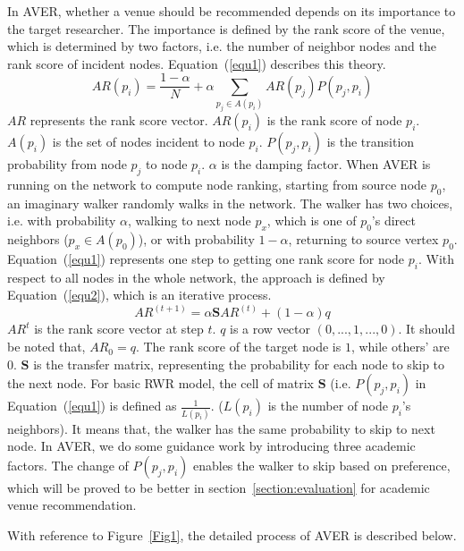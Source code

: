 \documentclass[9pt]{acm_proc_article-sp}
\begin{document}
In AVER, whether a venue should be recommended depends on its importance to the target researcher. The importance is defined by the rank score of the venue, which is determined by two factors, i.e. the number of neighbor nodes and the rank score of incident nodes. Equation~(\ref{equ1}) describes this theory.
\begin{equation}
\label{equ1}
AR(p_{i})=\frac{1-\alpha}{N}+\alpha \sum_{p_{j}\in A(p_{i})}AR(p_{j})P(p_{j},p_{i})
\end{equation}
$AR$ represents the rank score vector. $AR(p_{i})$ is the rank score of node $p_{i}$. $A(p_{i})$ is the set of nodes incident to node $p_{i}$. $P(p_{j},p_{i})$ is the transition probability from node $p_{j}$ to node $p_{i}$. $\alpha$ is the damping factor. When AVER is running on the network to compute node ranking, starting from source node $p_{0}$, an imaginary walker randomly walks in the network. The walker has two choices, i.e. with probability $\alpha$, walking to next node $p_{x}$, which is one of $p_{0}$'s direct neighbors ($p_{x}\in A(p_{0})$), or with probability $1-\alpha$, returning to source vertex $p_{0}$. Equation~(\ref{equ1}) represents one step to getting one rank score for node $p_{i}$. With respect to all nodes in the whole network, the approach is defined by Equation~(\ref{equ2}), which is an iterative process.
\begin{equation}
\label{equ2}
AR^{(t+1)}=\alpha \mathbf{S}AR^{(t)}+(1-\alpha)q
\end{equation}
$AR^{t}$ is the rank score vector at step $t$. $q$ is a row vector $(0,...,1,...,0)$. It should be noted that, $AR_{0}=q$. The rank score of the target node is $1$, while others' are $0$. $\mathbf{S}$ is the transfer matrix, representing the probability for each node to skip to the next node. For basic RWR model, the cell of matrix $\mathbf{S}$ (i.e. $P(p_{j},p_{i})$ in Equation~(\ref{equ1}) is defined as $\frac{1}{L(p_{i})}$. ($L(p_{i})$ is the number of node $p_{i}$'s neighbors). It means that, the walker has the same probability to skip to next node. In AVER, we do some guidance work by introducing three academic factors. The change of $P(p_{j},p_{i})$ enables the walker to skip based on preference, which will be proved to be better in section~\ref{section:evaluation} for academic venue recommendation.

With reference to Figure~\ref{Fig1}, the detailed process of AVER is described below.
\end{document}
